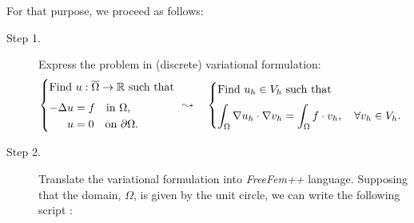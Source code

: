 \documentclass[12pt]{article}
\newcommand{\FF}{\textit{FreeFem++}\xspace}
\begin{document}
For that purpose, we proceed as follows:
\begin{description}
\item[Step 1.] Express the problem in (discrete) variational formulation:
  \vspace{-1ex}
  \begin{equation*}
    \begin{cases}
      \text{Find } u:\overline\Omega \rightarrow \Rset
      \text{ such that }
      \\\noalign{\medskip}
      \begin{aligned}
        -\Delta u &= f \quad\text{in } \Omega,
        \\
        u &= 0 \quad\text{on } \partial\Omega.
      \end{aligned}
    \end{cases}
    \hspace{-1em}\leadsto\quad
    \begin{cases}
      \text{Find $u_h\in V_{h}$ such that}
      \\\noalign{\medskip}
      \begin{aligned}
        \int_\Omega \nabla u_h \cdot \nabla v_h = \int_\Omega f \cdot
        v_h,
        \quad \forall v_h\in V_{h}.
      \end{aligned}
    \end{cases}
  \end{equation*}

\item[Step 2.] Translate the variational formulation into \FF
  language.
  Supposing that the domain, $\Omega$, is given by the unit circle, we
  can write the following script :


\end{description}
\end{document}
